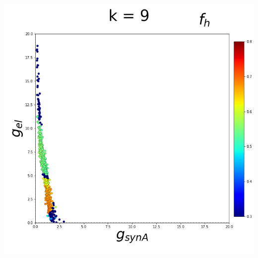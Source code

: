 \documentclass[11pt]{article}
\begin{document}
\begin{center}
\includegraphics[scale=0.125]{DSN_figs/STGCircuit_DSN_c=2_rs=3_k=9.png}
{%
\setlength{\fboxsep}{0pt}%
\setlength{\fboxrule}{1pt}%
%
}%
\end{center}
\end{document}

